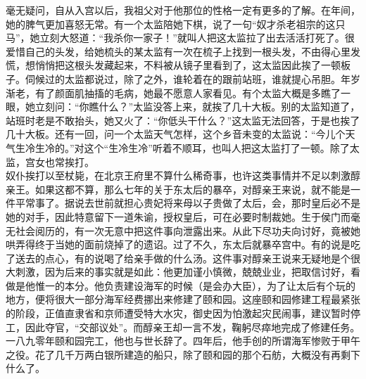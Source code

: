 毫无疑问，自从入宫以后，我祖父对于他那位的性格一定有更多的了解。在年间，她的脾气更加喜怒无常。有一个太监陪她下棋，说了一句“奴才杀老祖宗的这只马”，她立刻大怒道：“我杀你一家子！”就叫人把这太监拉了出去活活打死了。很爱惜自己的头发，给她梳头的某太监有一次在梳子上找到一根头发，不由得心里发慌，想悄悄把这根头发藏起来，不料被从镜子里看到了，这太监因此挨了一顿板子。伺候过的太监都说过，除了之外，谁轮着在的跟前站班，谁就提心吊胆。年岁渐老，有了颜面肌抽搐的毛病，她最不愿意人家看见。有个太监大概是多瞧了一眼，她立刻问：“你瞧什么？”太监没答上来，就挨了几十大板。别的太监知道了，站班时老是不敢抬头，她又火了：“你低头干什么？”这太监无法回答，于是也挨了几十大板。还有一回，问一个太监天气怎样，这个乡音未变的太监说：“今儿个天气生冷生冷的。”对这个“生冷生冷”听着不顺耳，也叫人把这太监打了一顿。除了太监，宫女也常挨打。\\

奴仆挨打以至杖毙，在北京王府里不算什么稀奇事，也许这类事情并不足以刺激醇亲王。如果这都不算，那么七年的关于东太后的暴卒，对醇亲王来说，就不能是一件平常事了。据说去世前就担心贵妃将来母以子贵做了太后，会，那时皇后必不是她的对手，因此特意留下一道朱谕，授权皇后，可在必要时制裁她。生于侯门而毫无社会阅历的，有一次无意中把这件事向泄露出来。从此下尽功夫向讨好，竟被她哄弄得终于当她的面前烧掉了的遗诏。过了不久，东太后就暴卒宫中。有的说是吃了送去的点心，有的说喝了给亲手做的什么汤。这件事对醇亲王说来无疑地是个很大刺激，因为后来的事实就是如此：他更加谨小慎微，兢兢业业，把取信讨好，看做是他惟一的本分。他负责建设海军的时候（是会办大臣），为了让太后有个玩的地方，便将很大一部分海军经费挪出来修建了颐和园。这座颐和园修建工程最紧张的阶段，正值直隶省和京师遭受特大水灾，御史因为怕激起灾民闹事，建议暂时停工，因此夺官，“交部议处”。而醇亲王却一言不发，鞠躬尽瘁地完成了修建任务。一八九零年颐和园完工，他也与世长辞了。四年后，他手创的所谓海军惨败于甲午之役。花了几千万两白银所建造的船只，除了颐和园的那个石舫，大概没有再剩下什么了。
